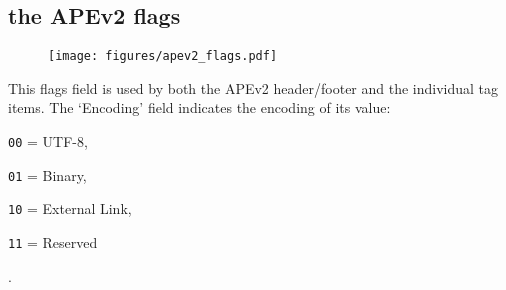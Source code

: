 \subsection{the APEv2 flags}
\begin{figure}[h]
\texttt{[image: figures/apev2\_flags.pdf]}
\end{figure}
\par
\noindent
This flags field is used by both the APEv2 header/footer and the
individual tag items.
The `Encoding' field indicates the encoding of its value:

\begin{inparaenum}
\item[\texttt{00} = ] UTF-8,
\item[\texttt{01} = ] Binary,
\item[\texttt{10} = ] External Link,
\item[\texttt{11} = ] Reserved
\end{inparaenum}
.
